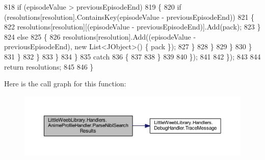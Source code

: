 \begin{DoxyCode}
818                                             \textcolor{keywordflow}{if} (episodeValue > previousEpisodeEnd)
819                                             \{
820                                                 \textcolor{keywordflow}{if} (resolutions[resolution].ContainsKey(episodeValue - 
      previousEpisodeEnd))
821                                                 \{
822                                                     resolutions[resolution][(episodeValue - 
      previousEpisodeEnd)].Add(pack);
823                                                 \}
824                                                 \textcolor{keywordflow}{else}
825                                                 \{
826                                                     resolutions[resolution].Add((episodeValue - 
      previousEpisodeEnd), \textcolor{keyword}{new} List<JObject>() \{ pack \});
827                                                 \}
828                                             \}
829                                         \}
830                                     \}
831                                 \}
832                             \}
833                         \}
834                     \}
835                     \textcolor{keywordflow}{catch}
836                     \{
837 
838                     \}
839                    
840                 \});
841 
842             \});
843 
844             \textcolor{keywordflow}{return} resolutions;
845 
846         \}
\end{DoxyCode}
Here is the call graph for this function\+:\nopagebreak
\begin{figure}[H]
\begin{center}
\leavevmode
\includegraphics[width=350pt]{class_little_weeb_library_1_1_handlers_1_1_anime_profile_handler_a92412693abdf9ea697e6b793b71d468f_cgraph}
\end{center}
\end{figure}
\mbox{\label{class_little_weeb_library_1_1_handlers_1_1_anime_profile_handler_a1bb944a0f0871b23484be89e2cf8705f}} 
